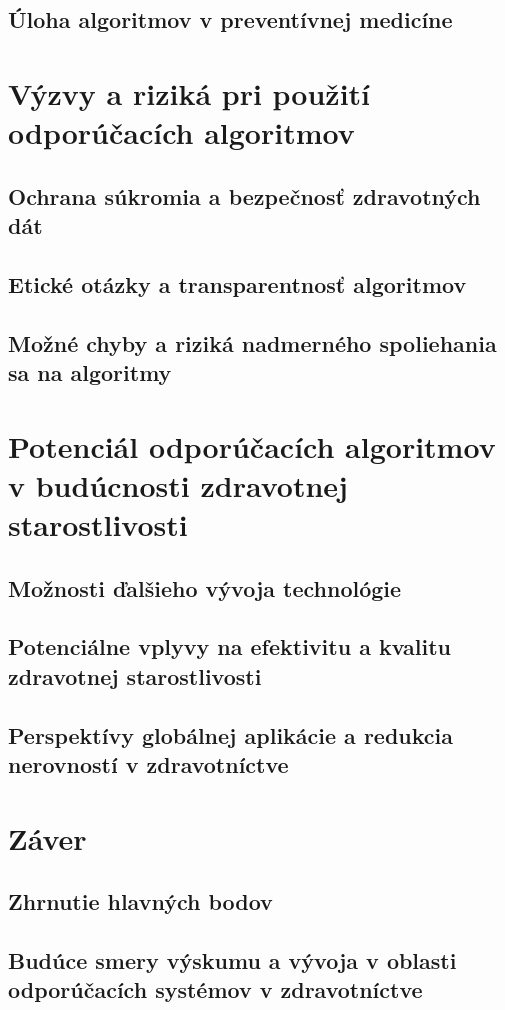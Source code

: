 \documentclass[10pt,twoside,,a4paper]{article}
\begin{document}
\subsection{Úloha algoritmov v preventívnej medicíne}
\section{Výzvy a riziká pri použití odporúčacích algoritmov}
\subsection{Ochrana súkromia a bezpečnosť zdravotných dát}
\subsection{Etické otázky a transparentnosť algoritmov}
\subsection{Možné chyby a riziká nadmerného spoliehania sa na algoritmy}
\section{Potenciál odporúčacích algoritmov v budúcnosti zdravotnej starostlivosti}
\subsection{Možnosti ďalšieho vývoja technológie}
\subsection{Potenciálne vplyvy na efektivitu a kvalitu zdravotnej starostlivosti}
\subsection{Perspektívy globálnej aplikácie a redukcia nerovností v zdravotníctve}
\section{Záver}
\subsection{Zhrnutie hlavných bodov}
\subsection{Budúce smery výskumu a vývoja v oblasti odporúčacích systémov v zdravotníctve}
\end{document}
